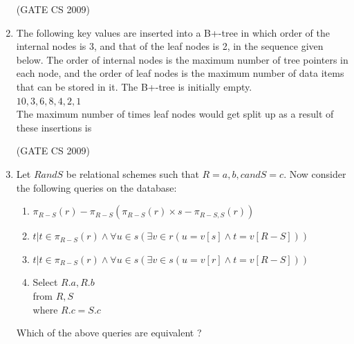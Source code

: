 \documentclass[a4paper, 11pt]{article}
\begin{document}
\begin{enumerate}
    \hfill (GATE CS 2009)

    \item The following key values are inserted into a B+-tree in which order of the internal nodes is 3, and that of the leaf nodes is 2, in the sequence given below. The order of internal nodes is the maximum number of tree pointers in each node, and the order of leaf nodes is the maximum number of data items that can be stored in it. The B+-tree is initially empty.\\
    $10, 3, 6, 8, 4, 2, 1$\\
    The maximum number of times leaf nodes would get split up as a result of these insertions is
    \begin{enumerate}
    \end{enumerate}

    \hfill (GATE CS 2009)

    \item Let $R and S$ be relational schemes such that $R= {a,b,c} and S = {c}$. Now consider the following queries on the database:\\
    \begin{enumerate}[label=\Roman*]
        \item $\pi_{R-S}(r)-\pi_{R-S}(\pi_{R-S}(r)\times s-\pi_{R-S,S}(r))$
        \item ${t|t \in \pi_{R-S}(r) \land \forall u \in s(\exists v \in r(u=v[s] \land t=v[R-S]))}$
        \item ${t|t \in \pi_{R-S}(r) \land \forall u \in s(\exists v \in s(u=v[r] \land t=v[R-S]))}$
        \item Select $R.a, R.b$\\ from $R, S$\\where $R.c=S.c$
    \end{enumerate}

    Which of the above queries are equivalent ?
    \begin{enumerate}
    \end{enumerate}


\end{enumerate}
\end{document}
